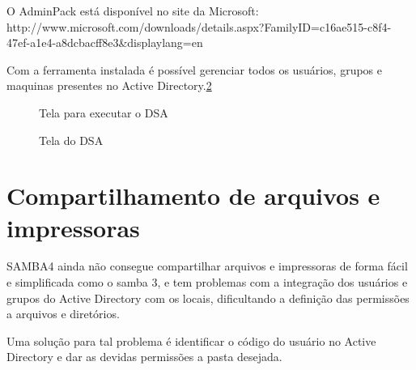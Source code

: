 O AdminPack está disponível no site da Microsoft:  http://www.microsoft.com/downloads/details.aspx?FamilyID=c16ae515-c8f4-47ef-a1e4-a8dcbacff8e3\&displaylang=en 

Com a ferramenta instalada é possível gerenciar todos os usuários, grupos e maquinas presentes no Active Directory.\ref{tela_dsa}

\begin{figure}[ht]
   	\centering
   	\caption{Tela para executar o DSA}
    \label{dsa}
\end{figure}

\begin{figure}[ht]
   	\centering
   	\caption{Tela do DSA}
    \label{tela_dsa}
\end{figure}


\section{Compartilhamento de arquivos e impressoras}

SAMBA4 ainda não consegue compartilhar arquivos e impressoras de forma fácil e simplificada como o samba 3, e tem problemas com a integração dos usuários e grupos do Active Directory com os locais, dificultando a definição das permissões a arquivos e diretórios.

Uma solução para tal problema é identificar o código do usuário no Active Directory e dar as devidas permissões a pasta desejada.

